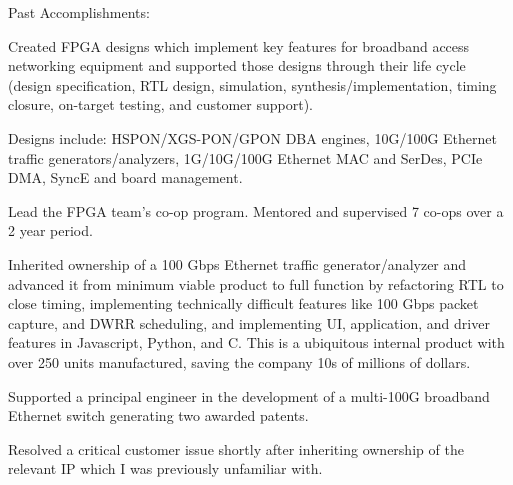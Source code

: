 \documentclass[10pt]{deedy-resume-reversed}
\begin{document}
\begin{minipage}[t]{1.0\textwidth}
Past Accomplishments:
\vspace{\topsep} %
\begin{tightemize}
\item Created FPGA designs which implement key features for broadband access networking equipment and
supported those designs through their life cycle (design specification, RTL design, simulation,
synthesis/implementation, timing closure, on-target testing, and customer support).
\item Designs include: HSPON/XGS-PON/GPON DBA engines, 10G/100G Ethernet traffic generators/analyzers,
1G/10G/100G Ethernet MAC and SerDes, PCIe DMA, SyncE and board management.
\item Lead the FPGA team's co-op program. Mentored and supervised 7 co-ops over a 2 year period.
\item Inherited ownership of a 100 Gbps Ethernet traffic generator/analyzer and advanced it from minimum viable product to full function by refactoring RTL to close timing,
implementing technically difficult features like 100 Gbps packet capture, and DWRR scheduling, and implementing UI, application,
and driver features in Javascript, Python, and C. This is a ubiquitous internal product with over 250 units manufactured, saving the company 10s of millions of dollars.
\item Supported a principal engineer in the development of a multi-100G broadband Ethernet switch generating two awarded patents.
\item Resolved a critical customer issue shortly after inheriting ownership of the relevant IP which I was previously unfamiliar with.

\end{tightemize}
\end{minipage}
\end{document}
